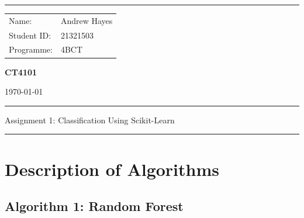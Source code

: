 \documentclass[a4paper, 10pt]{article}
\begin{document}
\hrule \medskip
\begin{minipage}{0.295\textwidth} 
    \vfill
    \raggedright
    \footnotesize 
    \begin{tabular}{@{}l l} %
        Name: & Andrew Hayes \\
        Student ID: & 21321503 \\
        Programme: & 4BCT \\
    \end{tabular}
    \vfill
\end{minipage}
\begin{minipage}{0.4\textwidth} 
    \centering 
    \Large 
    \vfill
    \textbf{CT4101}
    \vfill
\end{minipage}
\begin{minipage}{0.295\textwidth} 
    \raggedleft
    \vfill
    \today
    \vfill
\end{minipage}
\smallskip
\hrule 
\begin{center}
    \normalsize
    Assignment 1: Classification Using Scikit-Learn
\end{center}
\hrule

\section{Description of Algorithms}
\subsection{Algorithm 1: Random Forest}
\end{document}
